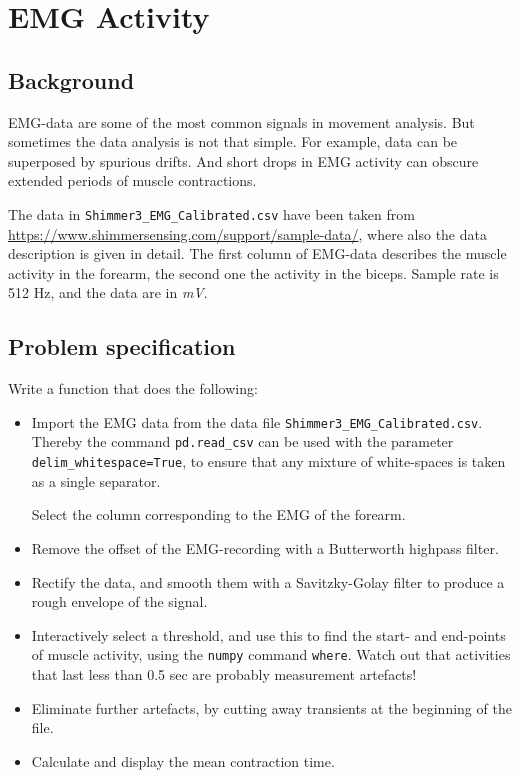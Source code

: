 \documentclass[12pt]{article}
\begin{document}
\section{EMG Activity}

\subsection{Background}

EMG-data are some of the most common signals in movement analysis. But
sometimes the data analysis is not that simple. For example, data can be
superposed by spurious drifts. And short drops in EMG activity can obscure
extended periods of muscle contractions.

The data in \lstinline{Shimmer3_EMG_Calibrated.csv} have been taken from \\
\url{https://www.shimmersensing.com/support/sample-data/}, where also the data
description is given in detail. The first column of EMG-data describes the
muscle activity in the forearm, the second one the activity in the biceps.
Sample rate is 512 Hz, and the data are in \emph{mV}. 

\subsection{Problem specification}

 Write a function that does the following:

 \begin{itemize}
     \item Import the EMG data from the data file
         \lstinline{Shimmer3_EMG_Calibrated.csv}. Thereby the command
         \texttt{pd.read\_csv} can be used with the parameter
         \texttt{delim\_whitespace=True}, to ensure that any mixture of
         white-spaces is taken as a single separator.

         Select the column corresponding to the EMG of the forearm.

    \item Remove the offset of the EMG-recording with a Butterworth highpass
        filter.

    \item Rectify the data, and smooth them with a Savitzky-Golay filter to
        produce a rough envelope of the signal.

    \item Interactively select a threshold, and use this to find the start- and
        end-points of muscle activity, using the \texttt{numpy} command
        \texttt{where}. Watch out that activities that last less
        than 0.5 sec are probably measurement artefacts!
 
    \item Eliminate further artefacts, by cutting away transients at the beginning of
        the file.
    \item Calculate and display the mean contraction time.

\end{itemize}
\end{document}
